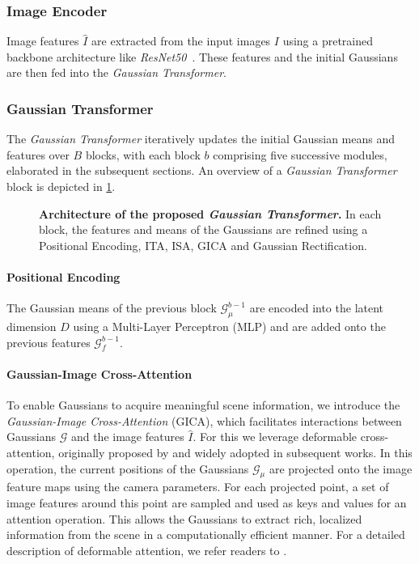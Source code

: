 \documentclass[10pt,twocolumn,letterpaper]{article}
\begin{document}
\subsubsection{Image Encoder} \label{sec:image encoder}
Image features $\hat{I}$ are extracted from the input images $I$ using a pretrained backbone architecture like \textit{ResNet50}~\cite{he2016deep}.
These features and the initial Gaussians are then fed into the \emph{Gaussian Transformer}.

\subsubsection{Gaussian Transformer} \label{sec:gaussian_transformer}
The \emph{Gaussian Transformer} iteratively updates the initial Gaussian means and features over $B$ blocks, with each block $b$ comprising five successive modules, elaborated in the subsequent sections.
An overview of a \emph{Gaussian Transformer} block is depicted in \cref{fig:gauss_transformer}. 

\begin{figure}
    \centering
    \caption{
        \textbf{Architecture of the proposed \emph{Gaussian Transformer}.}
        In each block, the features and means of the Gaussians are refined using a Positional Encoding, ITA, ISA, GICA and Gaussian Rectification.
    }
    \label{fig:gauss_transformer}
    \vspace{-3mm}
\end{figure}

\paragraph{Positional Encoding}
The Gaussian means of the previous block $\mathcal{G}_\mu^{b-1}$ are encoded into the latent dimension $D$ using a Multi-Layer Perceptron (MLP) and are added onto the previous features $\mathcal{G}_f^{b-1}$.

\paragraph{Gaussian-Image Cross-Attention}
To enable Gaussians to acquire meaningful scene information, we introduce the \emph{Gaussian-Image Cross-Attention} (GICA), which facilitates interactions between Gaussians $\mathcal{G}$ and the image features $\hat{I}$.
For this we leverage deformable cross-attention, originally proposed by \cite{li2022bevformer} and widely adopted in subsequent works.
In this operation, the current positions of the Gaussians $\mathcal{G}_\mu$ are projected onto the image feature maps using the camera parameters.
For each projected point, a set of image features around this point are sampled and used as keys and values for an attention operation.
This allows the Gaussians to extract rich, localized information from the scene in a computationally efficient manner.
For a detailed description of deformable attention, we refer readers to \cite{li2022bevformer}.
\end{document}
